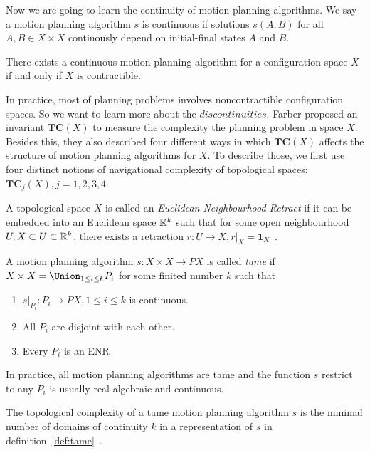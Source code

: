 Now we are going to learn the continuity of motion planning algorithms.
We say a motion planning algorithm \(s\) is continuous if solutions \(s(A,B)\) for all \(A,B\in X\times X\) continously depend on initial-final states \(A\) and \(B\).

\begin{lemma}
There exists a continuous motion planning algorithm for a configuration space \(X\) if and only if \(X\) is contractible.
\end{lemma}
In practice, most of planning problems involves noncontractible configuration spaces.
So we want to learn more about the \(discontinuities\).
Farber proposed an invariant \(\mathbf{TC}(X)\) to measure the complexity the planning problem in space \(X\).
Besides this, they also described four different ways in which \(\mathbf{TC}(X)\) affects the structure of motion planning algorithms for \(X\).
To describe those, we first use four distinct notions of navigational complexity of topological spaces: \(\mathbf{TC}_j(X), j=1,2,3,4\).

A topological space \(X\) is called an \textit{Euclidean Neighbourhood Retract} if it can be embedded into an Euclidean space \(\mathbb{R}^k\) such that for some open neighbourhood \(U, X\subset U\subset \mathbb{R}^k\), there exists a retraction \(r:U\to X,r|_X=\mathbf{1}_X\)~\cite{farber2004instabilities}.
\begin{definition}\label{def:tame}
  A motion planning algorithm \(s:X\times X\to PX\) is called \emph{tame} if \(X\times X=\Union_{1\le i\le k} P_i\) for some finited number \(k\) such that
  \begin{enumerate}[label=\arabic*)]
  \item \(s|_{P_i}:P_i\to PX, 1\le i\le k\) is continuous.
  \item All \(P_i\) are disjoint with each other.
  \item Every \(P_i\) is an ENR
  \end{enumerate}
\end{definition}

In practice, all motion planning algorithms are tame and the function \(s\) restrict to any \(P_i\) is usually real algebraic and continuous.

\begin{definition}
  The topological complexity of a tame motion planning algorithm \(s\) is the minimal number of domains of continuity \(k\) in a representation of \(s\) in definition~\ref{def:tame}~\cite{farber2006topology}.
\end{definition}


